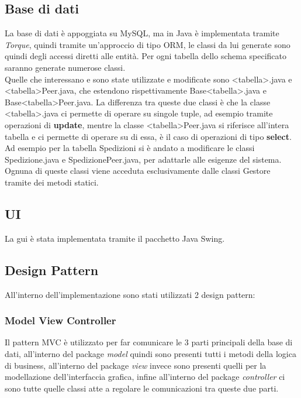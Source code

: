 \subsection{Base di dati}
La base di dati è appoggiata su MySQL, ma in Java è implementata tramite \textit{Torque}, quindi tramite un'approccio di tipo ORM, le classi da lui generate sono quindi degli accessi diretti alle entità. Per ogni tabella dello schema specificato saranno generate numerose classi. \\
Quelle che interessano e sono state utilizzate e modificate sono <tabella>.java e <tabella>Peer.java, che estendono rispettivamente Base<tabella>.java e Base<tabella>Peer.java. La differenza tra queste due classi è che la classe <tabella>.java ci permette di operare su singole tuple, ad esempio tramite operazioni di \textbf{update}, mentre la classe <tabella>Peer.java si riferisce all'intera tabella e ci permette di operare su di essa, è il caso di operazioni di tipo \textbf{select}. \\ 
Ad esempio per la tabella Spedizioni si è andato a modificare le classi Spedizione.java e SpedizionePeer.java, per adattarle alle esigenze del sistema. Ognuna di queste classi viene acceduta esclusivamente dalle classi Gestore tramite dei metodi statici.
\subsection{UI}
La gui è stata implementata tramite il pacchetto Java Swing.
\subsection{Design Pattern}
All'interno dell'implementazione sono stati utilizzati 2 design pattern:
\subsubsection{Model View Controller}
Il pattern MVC è utilizzato per far comunicare le 3 parti principali della base di dati, all'interno del package \textit{model} quindi sono presenti tutti i metodi della logica di business, all'interno del package \textit{view} invece sono presenti quelli per la modellazione dell'interfaccia grafica, infine all'interno del package \textit{controller} ci sono tutte quelle classi atte a regolare le comunicazioni tra queste due parti.
